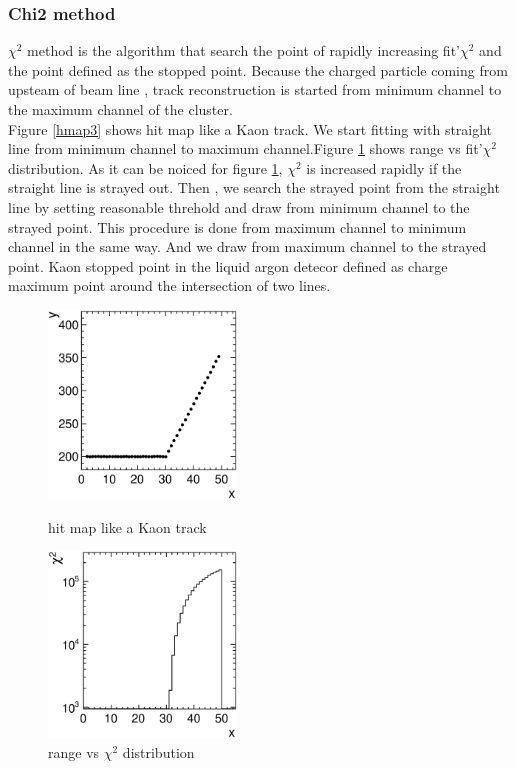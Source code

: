 \subsubsection{Chi2 method}
$\chi^{2}$ method is the algorithm that search the point of rapidly increasing fit'$\chi^{2}$ and the point defined as the stopped point.
Because the charged particle coming from upsteam of beam line , track reconstruction is started from minimum channel  to the maximum channel of the cluster.\\
Figure \ref{hmap3} shows hit map like a Kaon track.
We start fitting with straight line from minimum channel to maximum channel.Figure \ref{xvschi} shows range vs fit'$\chi^{2}$ distribution.
As it can be noiced for figure \ref{xvschi}, $\chi^{2}$ is increased rapidly if the straight line is strayed out.
Then , we search the strayed point from the straight line by setting reasonable threhold and draw from minimum channel to the strayed point.
This procedure is done from maximum channel to minimum channel in the same way.
And we draw from maximum channel to the strayed point.
Kaon stopped point in the liquid argon detecor defined as charge maximum point around the intersection of two lines.


\begin{figure}[!htb]
  \begin{minipage}{0.5\hsize}
    \begin{center}
      \includegraphics[width=50mm]{fig/hmap_kink_chi2.eps}
    \end{center}
    \caption{hit map like a Kaon track}
    \label{hmap3}
  \end{minipage}
  \begin{minipage}{0.5\hsize}
    \begin{center}
      \includegraphics[width=50mm]{fig/chi2_kink_chi2.eps}
    \end{center}
    \caption{range vs $\chi^{2}$ distribution}
    \label{xvschi}
  \end{minipage}
\end{figure}


